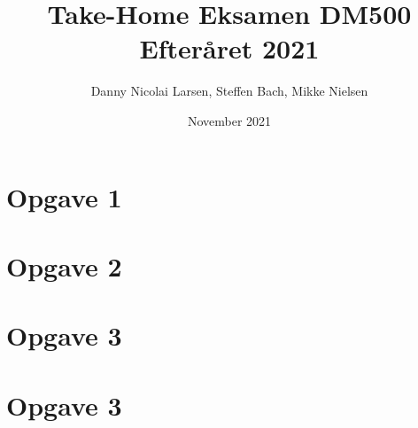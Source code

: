 \documentclass[20pt]{article}
\title{Take-Home Eksamen DM500 Efteråret 2021}
\author{Danny Nicolai Larsen, Steffen Bach, Mikke Nielsen}
\date{November 2021}
\begin{document}
	\maketitle
	
	\section*{Opgave 1}



	\section*{Opgave 2}
	
	
	
	\section*{Opgave 3}
	
	
	
	\section*{Opgave 3}
	

	
	
	
	
\end{document}
